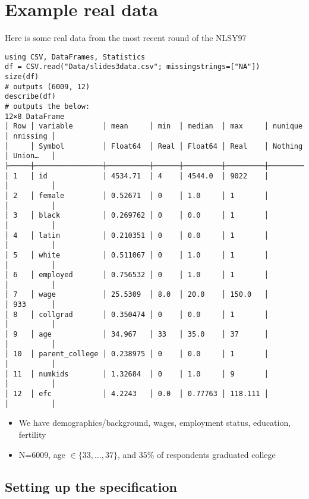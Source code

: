 \documentclass[11pt]{article}
\begin{document}
\section{Example real data}
\label{sec:orgf124b96}

Here is some real data from the most recent round of the NLSY97

\begin{verbatim}
using CSV, DataFrames, Statistics
df = CSV.read("Data/slides3data.csv"; missingstrings=["NA"])
size(df)
# outputs (6009, 12)
describe(df)
# outputs the below:
12×8 DataFrame
│ Row │ variable       │ mean     │ min  │ median  │ max     │ nunique │ nmissing │
│     │ Symbol         │ Float64  │ Real │ Float64 │ Real    │ Nothing │ Union…   │
├─────┼────────────────┼──────────┼──────┼─────────┼─────────┼─────────┼──────────┤
│ 1   │ id             │ 4534.71  │ 4    │ 4544.0  │ 9022    │         │          │
│ 2   │ female         │ 0.52671  │ 0    │ 1.0     │ 1       │         │          │
│ 3   │ black          │ 0.269762 │ 0    │ 0.0     │ 1       │         │          │
│ 4   │ latin          │ 0.210351 │ 0    │ 0.0     │ 1       │         │          │
│ 5   │ white          │ 0.511067 │ 0    │ 1.0     │ 1       │         │          │
│ 6   │ employed       │ 0.756532 │ 0    │ 1.0     │ 1       │         │          │
│ 7   │ wage           │ 25.5309  │ 8.0  │ 20.0    │ 150.0   │         │ 933      │
│ 8   │ collgrad       │ 0.350474 │ 0    │ 0.0     │ 1       │         │          │
│ 9   │ age            │ 34.967   │ 33   │ 35.0    │ 37      │         │          │
│ 10  │ parent_college │ 0.238975 │ 0    │ 0.0     │ 1       │         │          │
│ 11  │ numkids        │ 1.32684  │ 0    │ 1.0     │ 9       │         │          │
│ 12  │ efc            │ 4.2243   │ 0.0  │ 0.77763 │ 118.111 │         │          │
\end{verbatim}

\begin{itemize}
\item We have demographics/background, wages, employment status, education, fertility
\item N=6009, age \(\in \{33,\ldots,37\}\), and 35\% of respondents graduated college
\end{itemize}

\subsection{Setting up the specification}
\label{sec:orgfab2057}
\end{document}
